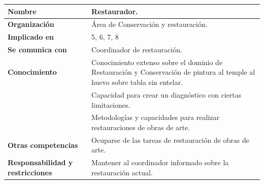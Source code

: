 \documentclass[a4paper,11pt]{article}
\begin{document}
			\begin{center}
				\begin{tabular}{| l | p{5.5cm} |}
					\hline
					\cellcolor[RGB]{224,233,250}\textbf{Nombre} & Restaurador.\\
					\hline
					\cellcolor[RGB]{224,233,250}\textbf{Organización} & Área de Conservación y
					restauración.\\
					\hline
					\cellcolor[RGB]{224,233,250}\textbf{Implicado en} & 5, 6, 7, 8\\
					\hline
					\cellcolor[RGB]{224,233,250}\textbf{Se comunica con} & Coordinador de
					restauración.\\
					\hline
					\cellcolor[RGB]{224,233,250}\textbf{Conocimiento} & Conocimiento extenso
					sobre el dominio de Restauración y Conservación de pintura al temple al huevo sobre tabla sin entelar.\\
					\cellcolor[RGB]{224,233,250}& Capacidad para crear un diagnóstico con
					ciertas limitaciones.\\
					\cellcolor[RGB]{224,233,250}& Metodologías y capacidades para realizar
					restauraciones de obras de arte.\\
					\hline
					\cellcolor[RGB]{224,233,250}\textbf{Otras competencias} & Ocuparse de las
					tareas de restauración de obras de arte.\\
					\hline
					\cellcolor[RGB]{224,233,250}\textbf{Responsabilidad y restricciones} &
					Mantener al coordinador informado sobre la restauración actual.\\
					\hline
				\end{tabular}
			\end{center}
			\newpage
\end{document}
